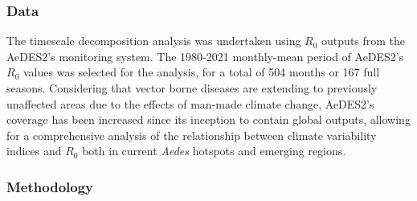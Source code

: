 \documentclass[article,10pt,twocolumn]{wlscirep}
\begin{document}
\subsubsection{Data} \label{sec-methods-1-data}
The timescale decomposition analysis was undertaken using $R_0$ outputs from the AeDES2's monitoring system. The 1980-2021 monthly-mean period of AeDES2's $R_0$ values was selected for the analysis, for a total of 504 months or 167 full seasons. Considering that vector borne diseases are extending to previously unaffected areas due to the effects of man-made climate change, AeDES2's coverage has been increased since its inception to contain global outputs, allowing for a comprehensive analysis of the relationship between climate variability indices and $R_0$ both in current \textit{Aedes} hotspots and emerging regions.

\subsubsection{Methodology} \label{sec-methods-1-methodology}
\end{document}
